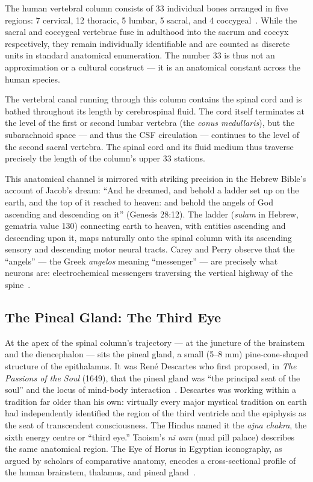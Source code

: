 \documentclass[12pt, a4paper]{article}
\begin{document}
The human vertebral column consists of 33 individual bones arranged in five
regions: 7 cervical, 12 thoracic, 5 lumbar, 5 sacral, and 4
coccygeal~\autocite[720]{gray2016}. While the sacral and coccygeal vertebrae
fuse in adulthood into the sacrum and coccyx respectively, they remain
individually identifiable and are counted as discrete units in standard
anatomical enumeration. The number 33 is thus not an approximation or a
cultural construct — it is an anatomical constant across the human species.

The vertebral canal running through this column contains the spinal cord and
is bathed throughout its length by cerebrospinal fluid. The cord itself
terminates at the level of the first or second lumbar vertebra (the
\emph{conus medullaris}), but the subarachnoid space — and thus the CSF
circulation — continues to the level of the second sacral vertebra. The
spinal cord and its fluid medium thus traverse precisely the length of the
column's upper 33 stations.

This anatomical channel is mirrored with striking precision in the Hebrew
Bible's account of Jacob's dream: ``And he dreamed, and behold a ladder set up
on the earth, and the top of it reached to heaven: and behold the angels of
God ascending and descending on it'' (Genesis 28:12). The ladder (\emph{sulam}
in Hebrew, gematria value 130) connecting earth to heaven, with entities
ascending and descending upon it, maps naturally onto the spinal column
with its ascending sensory and descending motor neural tracts. Carey and
Perry observe that the ``angels'' — the Greek \emph{angelos} meaning
``messenger'' — are precisely what neurons are: electrochemical messengers
traversing the vertical highway of the spine~\autocite[44]{carey1932}.

\subsection{The Pineal Gland: The Third Eye}

At the apex of the spinal column's trajectory — at the juncture of the
brainstem and the diencephalon — sits the pineal gland, a small (5--8 mm)
pine-cone-shaped structure of the epithalamus. It was René Descartes who
first proposed, in \emph{The Passions of the Soul} (1649), that the pineal
gland was ``the principal seat of the soul'' and the locus of
mind-body interaction~\autocite{descartes1649}. Descartes was working
within a tradition far older than his own: virtually every major mystical
tradition on earth had independently identified the region of the third
ventricle and the epiphysis as the seat of transcendent consciousness. The
Hindus named it the \emph{ajna chakra}, the sixth energy centre or ``third
eye.'' Taoism's \emph{ni wan} (mud pill palace) describes the same anatomical
region. The Eye of Horus in Egyptian iconography, as argued by scholars of
comparative anatomy, encodes a cross-sectional profile of the human
brainstem, thalamus, and pineal
gland~\autocite[198]{schwaller1998}\autocite[312]{hall1928}.
\end{document}
